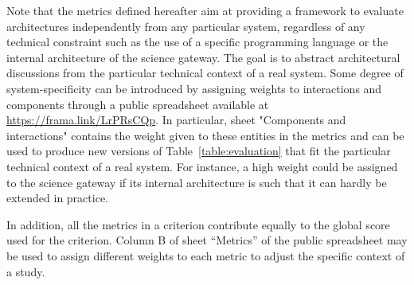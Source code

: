 \documentclass[preprint,3p,twocolumn]{elsarticle}
\newcommand{\correction}[1]{\color{blue}#1\color{black}\xspace}
\begin{document}
\correction{Note that the metrics defined hereafter aim at providing a framework
to evaluate architectures independently from any particular system,
regardless of any technical constraint such as the use of a specific
programming language or the internal architecture of the science
gateway. The goal is to abstract architectural discussions from the
particular technical context of a real system. Some degree of
system-specificity can be introduced by assigning weights to
interactions and components through a public spreadsheet available at
\url{https://frama.link/LrPRsCQp}. In particular, sheet "Components
and interactions" contains the weight given to these entities in the
metrics and can be used to produce new versions of
Table~\ref{table:evaluation} that fit the particular technical context
of a real system. For instance, a high weight could be assigned to the
science gateway if its internal architecture is such that it can
hardly be extended in practice.}

\correction{In addition, all the metrics in a criterion contribute
  equally to the global score used for the criterion. Column B of
  sheet ``Metrics'' of the public spreadsheet may be used to assign
  different weights to each metric to adjust the specific context of a
  study.}
\end{document}

